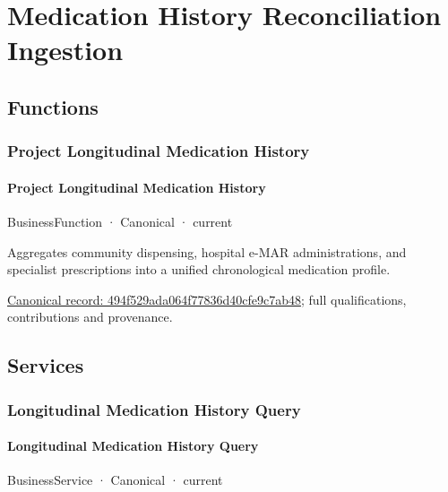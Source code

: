 \section{Medication History Reconciliation Ingestion}

\subsection{Functions}

\subsubsection{Project Longitudinal Medication History}

\paragraph{Project Longitudinal Medication History}

\label{element:494f529ada064f77836d40cfe9c7ab48}
{\small BusinessFunction · Canonical · current}\par

Aggregates community dispensing, hospital e-MAR administrations, and specialist prescriptions into a unified chronological medication profile.


{\footnotesize \href{../../../../continuum/business/business-function/494f529ada064f77836d40cfe9c7ab48.md}{Canonical record: 494f529ada064f77836d40cfe9c7ab48}; full qualifications, contributions and provenance.}\par
\subsection{Services}

\subsubsection{Longitudinal Medication History Query}

\paragraph{Longitudinal Medication History Query}

\label{element:6a42771bbe5449ab87e8ece94519d03d}
{\small BusinessService · Canonical · current}\par

